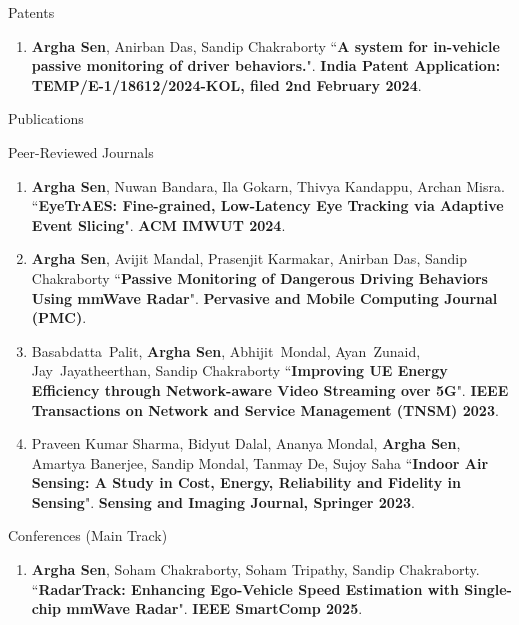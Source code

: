 \documentclass{resume} %
\begin{document}
	\begin{rSection}{Patents}
		\begin{enumerate}
			\item \textbf{Argha Sen}, Anirban Das, Sandip Chakraborty ``\textbf{A system for in-vehicle passive monitoring of driver behaviors.}". \textbf{India Patent Application: TEMP/E-1/18612/2024-KOL, filed 2nd February 2024}.
		\end{enumerate} 
	\end{rSection}
	\newpage
	\begin{rSection}{Publications} 
		\begin{rSubsection}{Peer-Reviewed Journals}{}{}{}
			
			\begin{enumerate}
				\small
				\item \textbf{Argha Sen}, Nuwan Bandara, Ila Gokarn, Thivya Kandappu, Archan Misra.
				``\textbf{EyeTrAES: Fine-grained, Low-Latency Eye Tracking via Adaptive Event Slicing}".
				\textbf{ACM IMWUT 2024}.
				
				\item \textbf{Argha Sen}, Avijit Mandal, Prasenjit Karmakar, Anirban Das, Sandip Chakraborty ``\textbf{Passive Monitoring of Dangerous Driving Behaviors Using mmWave Radar}". \textbf{Pervasive and Mobile Computing Journal (PMC)}.
				
				\item Basabdatta~Palit, \textbf{Argha Sen}, Abhijit~Mondal, Ayan~Zunaid, Jay~Jayatheerthan, Sandip Chakraborty ``\textbf{Improving UE Energy Efficiency through Network-aware Video Streaming over 5G}". \textbf{IEEE Transactions on Network and Service Management (TNSM) 2023}.
				
				\item Praveen Kumar Sharma, Bidyut Dalal, Ananya Mondal, \textbf{Argha Sen}, Amartya Banerjee, Sandip Mondal, Tanmay De, Sujoy Saha ``\textbf{Indoor Air Sensing: A Study in Cost, Energy, Reliability and Fidelity in Sensing}". \textbf{Sensing and Imaging Journal, Springer 2023}.
				
			\end{enumerate}
			
		\end{rSubsection}{}{}{}{}
		
		\begin{rSubsection}{Conferences (Main Track)}{}{}{}
			
			\begin{enumerate}
				\small
				\item \textbf{Argha Sen}, Soham Chakraborty, Soham Tripathy, Sandip Chakraborty.	``\textbf{RadarTrack: Enhancing Ego-Vehicle Speed Estimation with Single-chip mmWave Radar}". \textbf{IEEE SmartComp 2025}.
				

\end{enumerate}
\end{rSubsection}
\end{rSection}
\end{document}
